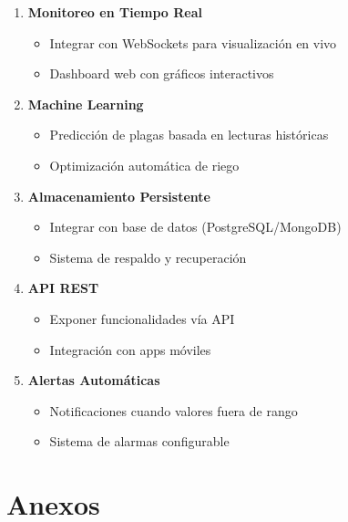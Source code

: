 \documentclass[12pt,a4paper]{article}
\begin{document}
\begin{enumerate}
    \item \textbf{Monitoreo en Tiempo Real}
    \begin{itemize}
        \item Integrar con WebSockets para visualización en vivo
        \item Dashboard web con gráficos interactivos
    \end{itemize}
    
    \item \textbf{Machine Learning}
    \begin{itemize}
        \item Predicción de plagas basada en lecturas históricas
        \item Optimización automática de riego
    \end{itemize}
    
    \item \textbf{Almacenamiento Persistente}
    \begin{itemize}
        \item Integrar con base de datos (PostgreSQL/MongoDB)
        \item Sistema de respaldo y recuperación
    \end{itemize}
    
    \item \textbf{API REST}
    \begin{itemize}
        \item Exponer funcionalidades vía API
        \item Integración con apps móviles
    \end{itemize}
    
    \item \textbf{Alertas Automáticas}
    \begin{itemize}
        \item Notificaciones cuando valores fuera de rango
        \item Sistema de alarmas configurable
    \end{itemize}
\end{enumerate}


\section{Anexos}
\end{document}

